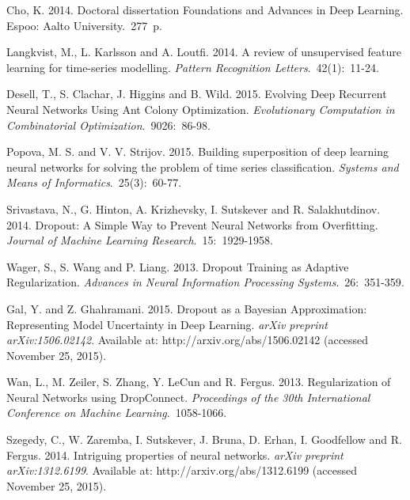 \documentclass[12pt]{article}
\begin{document}
\renewcommand\refname{References}

\begin{thebibliography}{10}

 {Cho, K.}
2014. Doctoral dissertation {Foundations and Advances in Deep Learning}. Espoo: Aalto University.~277~p.

 {Langkvist, M., L. Karlsson and A. Loutfi.}
2014. A review of unsupervised feature learning for time-series modelling. \emph{Pattern Recognition Letters}.~42(1):~11-24.

 {Desell, T., S. Clachar, J. Higgins and B. Wild.}
2015. Evolving Deep Recurrent Neural Networks Using Ant
Colony Optimization. \emph{Evolutionary Computation in Combinatorial Optimization}.~9026:~86-98.

 {Popova, M. S. and V. V. Strijov.}
2015. Building superposition of deep learning neural networks
for solving the problem of time series classification. \emph{Systems and Means of Informatics}.~25(3):~60-77.


{Srivastava, N., G. Hinton, A. Krizhevsky, I. Sutskever and R. Salakhutdinov. }
2014. Dropout: A Simple Way to Prevent Neural Networks from
Overfitting. \emph{Journal of Machine Learning Research}.~15:~1929-1958.

{Wager, S., S. Wang and P. Liang.}
2013. Dropout Training as Adaptive Regularization. \emph{Advances in Neural Information Processing Systems}.~\mbox{26:~{351-359}}.

{Gal, Y. and Z. Ghahramani.}
2015. Dropout as a Bayesian Approximation:
Representing Model Uncertainty in Deep Learning. \emph{arXiv preprint arXiv:1506.02142}. Available at: http://arxiv.org/abs/1506.02142 (accessed November 25, 2015).

{Wan, L., M. Zeiler, S. Zhang, Y. LeCun and R. Fergus. }
2013. Regularization of Neural Networks using DropConnect. \emph{Proceedings of the 30th International Conference on Machine Learning}.~1058-1066.


{Szegedy, C.,
W. Zaremba,
I. Sutskever,
J. Bruna,
D. Erhan,
I. Goodfellow and
R. Fergus.}
2014. Intriguing properties of neural networks.  \emph{arXiv preprint arXiv:1312.6199}. Available at: http://arxiv.org/abs/1312.6199 (accessed November 25, 2015).


\end{thebibliography}
\end{document}
